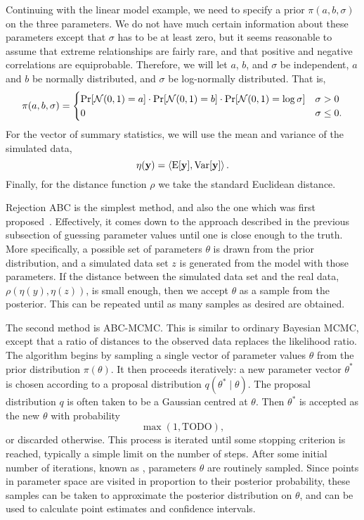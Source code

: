Continuing with the linear model example, we need to specify a prior $\pi(a, b,
\sigma)$ on the three parameters. We do not have much certain information about
these parameters except that $\sigma$ has to be at least zero, but it seems
reasonable to assume that extreme relationships are fairly rare, and that
positive and negative correlations are equiprobable. Therefore, we will let
$a$, $b$, and $\sigma$ be independent, $a$ and $b$ be normally distributed,
and $\sigma$ be log-normally distributed. That is,
\[
  \pi(a, b, \sigma) = 
  \begin{cases}
    \Pr[\mathcal{N}(0, 1) = a] \cdot \Pr[\mathcal{N}(0, 1) = b] \cdot \Pr[\mathcal{N}(0, 1) = \log\sigma]
     & \sigma > 0 \\
    0 & \sigma \le 0.
  \end{cases}
\]
For the vector of summary statistics, we will use the mean and variance of the
simulated data,
\[
  \eta(\mathbf{y}) = \left<\operatorname{E}[\mathbf{y}], \operatorname{Var}[\mathbf{y}]\right>.
\]
Finally, for the distance function $\rho$ we take the standard Euclidean
distance.

Rejection ABC is the simplest method, and also the one which was first
proposed~\autocite{rubin1984bayesianly}. Effectively, it comes down to the
approach described in the previous subsection of guessing parameter values
until one is close enough to the truth. More specifically, a possible set of
parameters $\theta$ is drawn from the prior distribution, and a simulated data
set $z$ is generated from the model with those parameters. If the distance
between the simulated data set and the real data, $\rho(\eta(y), \eta(z))$, is
small enough, then we accept $\theta$ as a sample from the posterior. This can
be repeated until as many samples as desired are obtained.

The second method is \gls{ABC}-\gls{MCMC}. This is similar to ordinary Bayesian
\gls{MCMC}, except that a ratio of distances to the observed data replaces the
likelihood ratio. The algorithm begins by sampling a single vector of parameter
values $\theta$ from the prior distribution $\pi(\theta)$. It then proceeds
iteratively: a new parameter vector $\theta^*$ is chosen according to a
proposal distribution $q(\theta^* \mid \theta)$. The proposal distribution $q$
is often taken to be a Gaussian centred at $\theta$. Then $\theta^*$ is
accepted as the new $\theta$ with probability
\[
  \max\left(1, \text{TODO} \right),
\]
or discarded otherwise. This process is iterated until some stopping criterion
is reached, typically a simple limit on the number of steps. After some initial
number of iterations, known as , parameters $\theta$ are
routinely sampled. Since points in parameter space are visited in proportion to
their posterior probability, these samples can be taken to approximate the
posterior distribution on $\theta$, and can be used to calculate point
estimates and confidence intervals.

